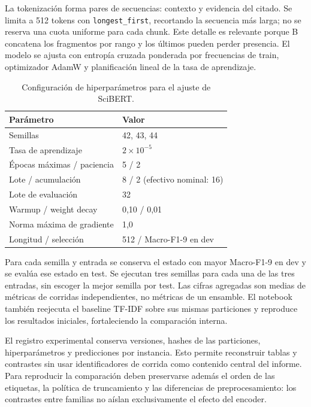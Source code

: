 \documentclass[10pt,a4paper,twocolumn]{article}
\begin{document}
La tokenización forma pares de secuencias: contexto y evidencia del citado. Se limita a 512 tokens con \texttt{longest\_first}, recortando la secuencia más larga; no se reserva una cuota uniforme para cada chunk. Este detalle es relevante porque B concatena los fragmentos por rango y los últimos pueden perder presencia. El modelo se ajusta con entropía cruzada ponderada por frecuencias de train, optimizador AdamW y planificación lineal de la tasa de aprendizaje.

\begin{table}[t]
\centering\small
\caption{Configuración de hiperparámetros para el ajuste de SciBERT.}\label{tab:hp}
\begin{tabularx}{\columnwidth}{@{}lY@{}}\toprule
Parámetro & Valor\\\midrule
Semillas & 42, 43, 44\\
Tasa de aprendizaje & $2\times10^{-5}$\\
Épocas máximas / paciencia & 5 / 2\\
Lote / acumulación & 8 / 2 (efectivo nominal: 16)\\
Lote de evaluación & 32\\
Warmup / weight decay & 0,10 / 0,01\\
Norma máxima de gradiente & 1,0\\
Longitud / selección & 512 / Macro-F1-9 en dev\\\bottomrule
\end{tabularx}
\end{table}

Para cada semilla y entrada se conserva el estado con mayor Macro-F1-9 en dev y se evalúa ese estado en test. Se ejecutan tres semillas para cada una de las tres entradas, sin escoger la mejor semilla por test. Las cifras agregadas son medias de métricas de corridas independientes, no métricas de un ensamble. El notebook también reejecuta el baseline TF-IDF sobre sus mismas particiones y reproduce los resultados iniciales, fortaleciendo la comparación interna.

El registro experimental conserva versiones, hashes de las particiones, hiperparámetros y predicciones por instancia. Esto permite reconstruir tablas y contrastes sin usar identificadores de corrida como contenido central del informe. Para reproducir la comparación deben preservarse además el orden de las etiquetas, la política de truncamiento y las diferencias de preprocesamiento: los contrastes entre familias no aíslan exclusivamente el efecto del encoder.
\end{document}
